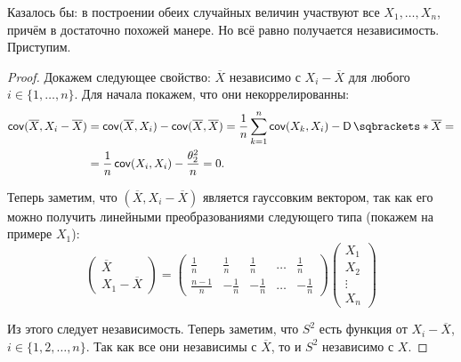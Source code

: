 Казалось бы: в построении обеих случайных величин участвуют все \(X_{1}, \dots, X_{n}\), 
причём в достаточно похожей манере. Но всё равно получается независимость. Приступим.

\begin{proof}
    Докажем следующее свойство: \(\overline{X}\) независимо с \(X_{i} - \overline{X}\) 
    для любого \(i \in \{1, \dots, n\}\). Для начала покажем, что они некоррелированны:
    \begin{align*}
        \cov(\overline{X}, X_{i} - \overline{X}) &= \cov(\overline{X}, X_{i}) - 
        \cov(\overline{X}, \overline{X}) = \frac{1}{n}\sum_{k = 1}^{n}\cov(X_{k}, X_{i}) 
        - \D{\overline{X}} = \\
        &= \frac{1}{n}\cov(X_{i}, X_{i}) - \frac{\theta_{2}^{2}}{n} = 0.
    \end{align*}
    
    Теперь заметим, что \((\overline{X}, X_{i} - \overline{X})\) является гауссовким 
    вектором, так как его можно получить линейными преобразованиями следующего типа 
    (покажем на 
    примере \(X_{1}\)):
    \[
    \begin{pmatrix}
    \overline{X} \\ X_{1} - \overline{X}
    \end{pmatrix}
    =
    \begin{pmatrix}
    \frac{1}{n} & \frac{1}{n} & \frac{1}{n} & \ldots & \frac{1}{n} \\
    \frac{n - 1}{n} & -\frac{1}{n} & -\frac{1}{n} & \ldots & -\frac{1}{n}
    \end{pmatrix}
    \begin{pmatrix}
    X_{1} \\ X_{2} \\ \vdots \\ X_{n}
    \end{pmatrix}
    \] 
    
    Из этого следует независимость. Теперь заметим, что \(S^{2}\) есть функция от \(X_{i} 
    - \overline{X}\), \(i \in \{1, 2, \dots, n\}\). Так как все они независимы с 
    \(\overline{X}\), то и \(S^{2}\) независимо с \(X\).
\end{proof}

